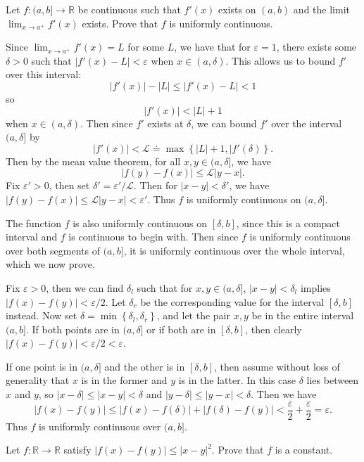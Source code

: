 \documentclass[10pt]{amsart}
\newenvironment{exercise}[1]{%
        \vspace{10mm}
        \renewcommand\themanualtheoreminner{#1}%
  \manualtheoreminner
}\hrulefill{\endmanualtheoreminner}
\begin{document}
\begin{exercise}{26}
	Let $f:(a,b]\to\mathbb{R}$ be continuous such that $f'(x)$ exists on $(a,b)$ and the limit $\lim_{x \to a^{+}} f'(x)$ exists. Prove that $f$ is uniformly continuous.
\end{exercise}

Since $\lim_{x \to a^{+}} f'(x) = L$ for some $L$, we have that for $\varepsilon = 1$, there exists some $\delta>0$ such that $|f'(x)-L| < \varepsilon$ when $x \in (a,\delta)$. This allows us to bound $f'$ over this interval:
\[
	|f'(x)|-|L| \leq |f'(x)-L| < 1
\] so
\[
	|f'(x)| < |L| + 1
\] when $x \in (a,\delta)$. Then since $f'$ exists at $\delta$, we can bound $f'$ over the interval $(a,\delta]$ by
\[
	|f'(x)| < \mathcal{L} \doteq \max \left\{ |L|+1, |f'(\delta) \right\}.
\] 
Then by the mean value theorem, for all $x,y \in (a,\delta]$, we have
\[
	|f(y)-f(x)| \leq \mathcal{L} |y-x|.
\] Fix $\varepsilon' > 0$, then set $\delta' = \varepsilon' / \mathcal{L}$. Then for $|x-y| < \delta'$, we have $|f(y)-f(x)| \leq \mathcal{L} |y-x| < \varepsilon'$. Thus $f$ is uniformly continuous on $(a,\delta]$.

The function $f$ is also uniformly continuous on $[\delta,b]$, since this is a compact interval and $f$ is continuous to begin with. Then since $f$ is uniformly continuous over both segments of $(a,b]$, it is uniformly continuous over the whole interval, which we now prove.

Fix $\varepsilon>0$, then we can find $\delta_l$ such that for $x,y \in (a,\delta]$, $|x-y| < \delta_l$ implies $|f(x)-f(y)| < \varepsilon/2$. Let $\delta_r$ be the corresponding value for the interval $[\delta,b]$ instead. Now set $\delta= \min\left\{ \delta_l, \delta_r \right\}$, and let the pair $x,y$ be in the entire interval $(a,b]$. If both points are in $(a,\delta]$ or if both are in $[\delta,b]$, then clearly $|f(x)-f(y)| < \varepsilon/2 < \varepsilon$.

If one point is in $(a,\delta]$ and the other is in $[\delta,b]$, then assume without loss of generality that $x$ is in the former and $y$ is in the latter. In this case $\delta$ lies between $x$ and $y$, so $|x-\delta| \leq |x-y| < \delta$ and $|y-\delta| \leq |y-x| < \delta$. Then we have
\[
	|f(x) - f(y)| \leq |f(x) - f(\delta)| + |f(\delta) - f(y)| < \frac{\varepsilon}{2} + \frac{\varepsilon}{2} = \varepsilon.
\] 
Thus $f$ is uniformly continuous over $(a,b]$.

\begin{exercise}{29}
	Let $f:\mathbb{R}\to\mathbb{R}$ satisfy $|f(x)-f(y)|\leq |x-y|^2$. Prove that $f$ is a constant.
\end{exercise}
\end{document}
